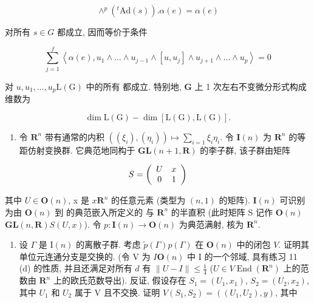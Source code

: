 \[
\wedge^ {p} (^ {t} \mathrm{Ad} (s)). \alpha (e) = \alpha (e)
\]

对所有 \(s \in G\) 都成立, 因而等价于条件

\[
\sum_ {j = 1} ^ {f} \left\langle \alpha (e), u _ {1} \wedge \dots \wedge u _ {j - 1} \wedge [ u, u _ {j} ] \wedge u _ {j + 1} \wedge \dots \wedge u _ {p} \right\rangle = 0
\]

对 \(u, u_1, \ldots, u_p\)\(\mathrm{L}(\mathrm{G})\) 中的所有  都成立. 特别地, \(\mathbf{G}\) 上 1 次左右不变微分形式构成维数为

\[
\dim \mathrm{L} (\mathrm{G}) - \dim [ \mathrm{L} (\mathrm{G}), \mathrm{L} (\mathrm{G}) ].
\]

\begin{enumerate}
\def\labelenumi{\arabic{enumi}.}
\setcounter{enumi}{12}
\tightlist
\item
  令 \(\mathbf{R}^n\) 带有通常的内积 \(((\xi_i), (\eta_i)) \mapsto \sum_{i=1} \xi_i \eta_i\). 令 \(\mathbf{I}(n)\) 为 \(\mathbf{R}^n\) 的等距仿射变换群. 它典范地同构于 \(\mathbf{GL}(n + 1, \mathbf{R})\) 的李子群, 该子群由矩阵
\end{enumerate}

\[
S = \left( \begin{array}{c c} U & x \\ 0 & 1 \end{array} \right)
\]

其中 \(U \in \mathbf{O}(n)\), x 是 \(x\)\(\mathbf{R}^n\) 的任意元素 (类型为 \((n,1)\) 的矩阵). \(\mathbf{I}(n)\) 可识别为由 \(\mathbf{O}(n)\) 到  的典范嵌入所定义的  与 \(\mathbf{R}^n\) 的半直积 (此时矩阵 S 记作 \(\mathbf{O}(n)\)\(\mathbf{GL}(n,\mathbf{R})\)\(S\)\((U,x)\)). 令 \(p\colon \mathbf{I}(n)\to \mathbf{O}(n)\) 为典范满射, 核为 \(\mathbf{R}^n\).

\begin{enumerate}
\def\labelenumi{(\alph{enumi})}
\tightlist
\item
  设 \(\Gamma\) 是 \(\mathrm{I}(n)\) 的离散子群. 考虑 \(\tilde{p}(\Gamma)\)\(p(\Gamma)\) 在 \(\mathbf{O}(n)\) 中的闭包 \(V\). 证明其单位元连通分支是交换的. (令 V 为 \(I\)\(\mathbf{O}(n)\) 中 I 的一个邻域, 具有练习 11 (d) 的性质, 并且还满足对所有 \(d\) 有 \(\|U - I\| \leqslant \frac{1}{4}\) (\(U \in V\)\(\operatorname{End}(\mathbf{R}^n)\) 上的范数由 \(\mathbf{R}^n\) 上的欧氏范数导出). 反证, 假设存在 \(S_1 = (U_1, x_1)\), \(S_2 = (U_2, x_2)\), 其中 \(U_1\) 和 \(U_2\) 属于 V 且不交换. 证明 \(V\)\((S_1, S_2) = ((U_1, U_2), y)\), 其中
\end{enumerate}

